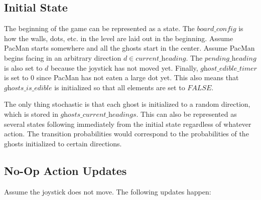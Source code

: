 \documentclass[paper=a4, fontsize=11pt]{scrartcl}
\begin{document}
\subsection{Initial State}

The beginning of the game can be represented as a state. The $\textit{board\_config}$ is how the walls, dots, etc. in the level are laid out in the beginning. Assume PacMan starts somewhere and all the ghosts start in the center. Assume PacMan begins facing in an arbitrary direction $d \in \textit{current\_heading}$. The $\textit{pending\_heading}$ is also set to $d$ because the joystick has not moved yet. Finally, $\textit{ghost\_edible\_timer}$ is set to $0$ since PacMan has not eaten a large dot yet. This also means that $\textit{ghosts\_is\_edible}$ is initialized so that all elements are set to $FALSE$.

The only thing stochastic is that each ghost is initialized to a random direction, which is stored in $\textit{ghosts\_current\_headings}$. This can also be represented as several states following immediately from the initial state regardless of whatever action. The transition probabilities would correspond to the probabilities of the ghosts initialized to certain directions.

\subsection{No-Op Action Updates}

Assume the joystick does not move. The following updates happen:
\end{document}
